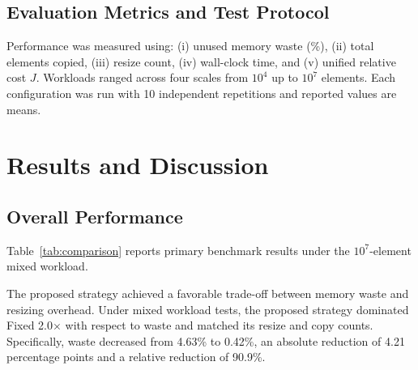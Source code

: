 \documentclass[conference]{IEEEtran}
\begin{document}
\subsection{Evaluation Metrics and Test Protocol}
Performance was measured using: (i) unused memory waste (\%), (ii) total elements copied, (iii) resize count, (iv) wall-clock time, and (v) unified relative cost $J$. Workloads ranged across four scales from $10^4$ up to $10^7$ elements. Each configuration was run with 10 independent repetitions and reported values are means.

\section{Results and Discussion}

\subsection{Overall Performance}
Table~\ref{tab:comparison} reports primary benchmark results under the $10^7$-element mixed workload.

\begin{table}[htbp]
\caption{Performance Comparison under $10^7$ Mixed Workload}
\label{tab:comparison}
\begin{center}
\end{center}
\end{table}

The proposed strategy achieved a favorable trade-off between memory waste and resizing overhead. Under mixed workload tests, the proposed strategy dominated Fixed 2.0$\times$ with respect to waste and matched its resize and copy counts. Specifically, waste decreased from 4.63\% to 0.42\%, an absolute reduction of 4.21 percentage points and a relative reduction of 90.9\%. 
\end{document}

